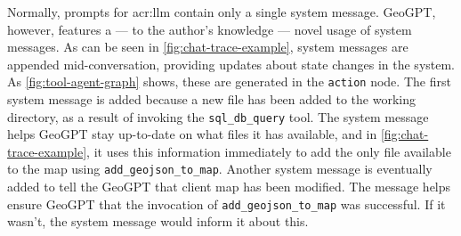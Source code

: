 Normally, prompts for \acrshort{acr:llm} contain only a single system message. GeoGPT, however, features a --- to the author's knowledge --- novel usage of system messages. As can be seen in \autoref{fig:chat-trace-example}, system messages are appended mid-conversation, providing updates about state changes in the system. As \autoref{fig:tool-agent-graph} shows, these are generated in the \texttt{action} node. The first system message is added because a new file has been added to the working directory, as a result of invoking the \texttt{sql\_db\_query} tool. The system message helps GeoGPT stay up-to-date on what files it has available, and in \autoref{fig:chat-trace-example}, it uses this information immediately to add the only file available to the map using \texttt{add\_geojson\_to\_map}. Another system message is eventually added to tell the GeoGPT that client map has been modified. The message helps ensure GeoGPT that the invocation of \texttt{add\_geojson\_to\_map} was successful. If it wasn't, the system message would inform it about this.

\glsresetall


